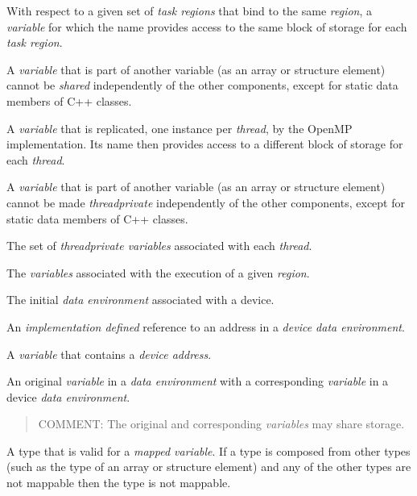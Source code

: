 \glossarydefstart
With respect to a given set of \emph{task regions} that bind to the same  
\emph{region}, a \emph{variable} for which the name provides access to the same block of storage for 
each \emph{task region}.

A \emph{variable} that is part of another variable (as an array or structure element) cannot 
be \emph{shared} independently of the other components, except for static data members 
of C++ classes.
\glossarydefend

\glossarydefstart
A \emph{variable} that is replicated, one instance per \emph{thread}, by the OpenMP 
implementation. Its name then provides access to a different block of storage for 
each \emph{thread}.

A \emph{variable} that is part of another variable (as an array or structure element) cannot 
be made \emph{threadprivate} independently of the other components, except for static 
data members of C++ classes. 
\glossarydefend

\glossarydefstart
The set of \emph{threadprivate variables} associated with each \emph{thread}.
\glossarydefend

\glossarydefstart
The \emph{variables} associated with the execution of a given \emph{region}. 
\glossarydefend

\glossarydefstart
The initial \emph{data environment} associated with a device.
\glossarydefend
\bigskip

\glossarydefstart
An \emph{implementation defined} reference to an address in a \emph{device
  data environment}.
\glossarydefend

\glossarydefstart
A \emph{variable} that contains a \emph{device address}.
\glossarydefend


\glossarydefstart
An original \emph{variable} in a \emph{data environment} with a corresponding \emph{variable} in a 
device \emph{data environment}.

\begin{quote}
COMMENT: The original and corresponding \emph{variables} may share storage.
\end{quote}
\glossarydefend

\glossarydefstart
A type that is valid for a \emph{mapped variable}. If a type is composed from other types 
(such as the type of an array or structure element) and any of the other types are 
not mappable then the type is not mappable.

